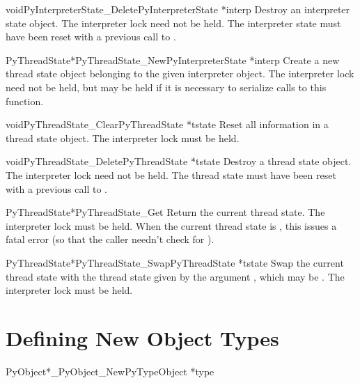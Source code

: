 \documentclass{manual}
\begin{document}
\begin{cfuncdesc}{void}{PyInterpreterState_Delete}{PyInterpreterState *interp}
Destroy an interpreter state object.  The interpreter lock need not be
held.  The interpreter state must have been reset with a previous
call to .
\end{cfuncdesc}

\begin{cfuncdesc}{PyThreadState*}{PyThreadState_New}{PyInterpreterState *interp}
Create a new thread state object belonging to the given interpreter
object.  The interpreter lock need not be held, but may be held if it
is necessary to serialize calls to this function.
\end{cfuncdesc}

\begin{cfuncdesc}{void}{PyThreadState_Clear}{PyThreadState *tstate}
Reset all information in a thread state object.  The interpreter lock
must be held.
\end{cfuncdesc}

\begin{cfuncdesc}{void}{PyThreadState_Delete}{PyThreadState *tstate}
Destroy a thread state object.  The interpreter lock need not be
held.  The thread state must have been reset with a previous
call to .
\end{cfuncdesc}

\begin{cfuncdesc}{PyThreadState*}{PyThreadState_Get}{}
Return the current thread state.  The interpreter lock must be held.
When the current thread state is \NULL{}, this issues a fatal
error (so that the caller needn't check for \NULL{}).
\end{cfuncdesc}

\begin{cfuncdesc}{PyThreadState*}{PyThreadState_Swap}{PyThreadState *tstate}
Swap the current thread state with the thread state given by the
argument , which may be \NULL{}.  The interpreter lock
must be held.
\end{cfuncdesc}


\chapter{Defining New Object Types \label{newTypes}}

\begin{cfuncdesc}{PyObject*}{_PyObject_New}{PyTypeObject *type}
\end{cfuncdesc}
\end{document}
